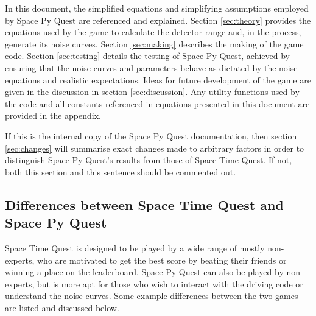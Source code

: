 \documentclass{article}
\begin{document}
In this document, the simplified equations and simplifying assumptions
employed by Space Py Quest are referenced and explained. 
Section \ref{sec:theory} provides the equations used by the game to
calculate the detector range and, in the process, generate its noise
curves. Section \ref{sec:making} describes the making of the game
code. Section \ref{sec:testing} details the testing of Space Py Quest,
achieved by ensuring that the noise curves and parameters behave as
dictated by the noise equations and realistic expectations. Ideas for
future development of the game are given in the discussion in section
\ref{sec:discussion}. Any utility functions used by the code and all
constants referenced in equations presented in this document are
provided in the appendix. 


If this is the internal copy of the Space Py Quest documentation, then
section \ref{sec:changes} will summarise exact changes made to
arbitrary factors in order to distinguish Space Py Quest's results
from those of Space Time Quest. If not, both this section and this
sentence should be commented out. 

\subsection{Differences between Space Time Quest and Space Py Quest}
\label{sec::differences}
Space Time Quest is designed to be played by a wide range of mostly
non-experts, who are motivated to get the best score by beating their
friends or winning a place on the leaderboard. Space Py Quest can also
be played by non-experts, but is more apt for those who wish to
interact with the driving code or understand the noise curves. Some
example differences between the two games are listed and discussed
below.
\end{document}
